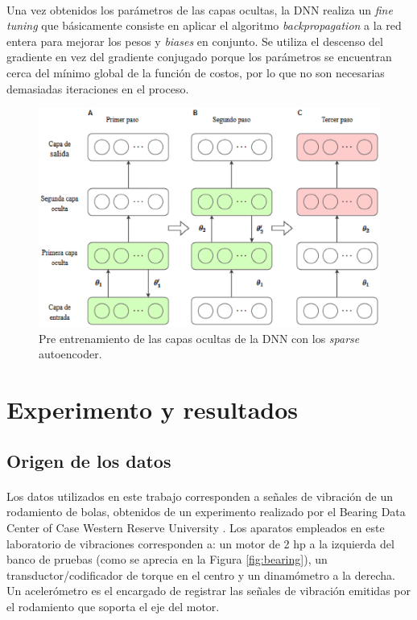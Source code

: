 \documentclass[a4paper,12pt]{article}
\begin{document}
\paragraph{}
Una vez obtenidos los parámetros de las capas ocultas, la DNN realiza un \textit{fine tuning} que básicamente consiste en aplicar el algoritmo \textit{backpropagation} a la red entera para mejorar los pesos y \textit{biases} en conjunto. Se utiliza el descenso del gradiente en vez del gradiente conjugado porque los parámetros se encuentran cerca del mínimo global de la función de costos, por lo que no son necesarias demasiadas iteraciones en el proceso.

\begin{figure}[ht]
  \centering
    \includegraphics[scale=0.9]{./training.eps}
  \caption{Pre entrenamiento de las capas ocultas de la DNN con los \textit{sparse} autoencoder.}
  \label{fig:deepnet}
\end{figure}

\section{Experimento y resultados}
\subsection{Origen de los datos}
\paragraph{}
Los datos utilizados en este trabajo corresponden a señales de vibración de un rodamiento de bolas, obtenidos de un experimento realizado por el Bearing Data Center of Case Western Reserve University \cite{case}. Los aparatos empleados en este laboratorio de vibraciones corresponden a: un motor de 2 hp a la izquierda del banco de pruebas (como se aprecia en la Figura \ref{fig:bearing}), un transductor/codificador de torque en el centro y un dinamómetro a la derecha. Un acelerómetro es el encargado de registrar las señales de vibración emitidas por el rodamiento que soporta el eje del motor.
\end{document}
